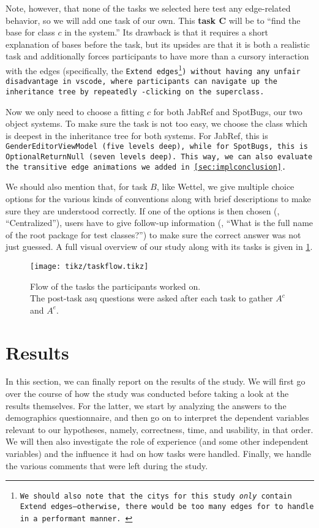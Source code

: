 \documentclass[../thesis]{subfiles}
\begin{document}
Note, however, that none of the tasks we selected here test any edge-related behavior, so we will add one task of our own.
This \textbf{task $\bm{C}$} will be to \enquote{find the \gls{base} for class $c$ in the system.}
Its drawback is that it requires a short explanation of \glspl{base} before the task, but its upsides are that it is both a realistic task and additionally forces participants to have more than a cursory interaction with the edges (specifically, the \tt{Extend} edges\footnote{
	We should also note that the \glspl{city} for this study \emph{only} contain \tt{Extend} edges---otherwise, there would be too many edges for \SEE{} to handle in a performant manner.
}) without having any unfair disadvantage in \gls{vscode}, where participants can navigate up the inheritance tree by repeatedly -clicking on the superclass.

Now we only need to choose a fitting $c$ for both JabRef and SpotBugs, our two object systems.
To make sure the task is not too easy, we choose the class which is deepest in the inheritance tree for both systems.
For JabRef, this is \tt{GenderEditorViewModel} (five levels deep), while for SpotBugs, this is \tt{OptionalReturnNull} (seven levels deep).
This way, we can also evaluate the transitive edge animations we added in \cref{sec:implconclusion}.

We should also mention that, for task $B$, like Wettel, we give multiple choice options for the various kinds of conventions along with brief descriptions to make sure they are understood correctly.
If one of the options is then chosen (\eg, \enquote{Centralized}), users have to give follow-up information (\eg, \enquote{What is the full name of the root package for test classes?}) to make sure the correct answer was not just guessed.
A full visual overview of our study along with its tasks is given in \cref{fig:taskflow}.

\begin{figure}
	\captionsetup{format=plain}
	\centering
	\texttt{[image: tikz/taskflow.tikz]}
	\caption{Flow of the tasks the participants worked on.\\
		The post-task \gls{asq} questions were asked after each task to gather $A^c$ and $A^e$.
	}\label{fig:taskflow}
\end{figure}


\section{Results}\label{sec:results}
In this section, we can finally report on the results of the study.
We will first go over the course of how the study was conducted before taking a look at the results themselves.
For the latter, we start by analyzing the answers to the demographics questionnaire, and then go on to interpret the dependent variables relevant to our hypotheses, namely, correctness, time, and usability, in that order.
We will then also investigate the role of experience (and some other independent variables) and the influence it had on how tasks were handled.
Finally, we handle the various comments that were left during the study.
\end{document}
